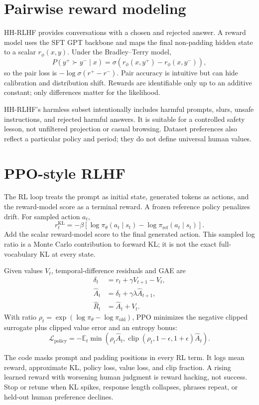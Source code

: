 \documentclass[11pt]{article}
\newcommand{\E}{\mathbb{E}}
\begin{document}
\section{Pairwise reward modeling}

HH-RLHF provides conversations with a chosen and rejected answer. A reward model
uses the SFT GPT backbone and maps the final non-padding hidden state to a scalar
$r_\phi(x,y)$. Under the Bradley--Terry model,
\[
P(y^+\succ y^-\mid x)=\sigma(r_\phi(x,y^+)-r_\phi(x,y^-)),
\]
so the pair loss is $-\log\sigma(r^+-r^-)$. Pair accuracy is intuitive but can
hide calibration and distribution shift. Rewards are identifiable only up to an
additive constant; only differences matter for the likelihood.

HH-RLHF's harmless subset intentionally includes harmful prompts, slurs, unsafe
instructions, and rejected harmful answers. It is suitable for a controlled
safety lesson, not unfiltered projection or casual browsing. Dataset preferences
also reflect a particular policy and period; they do not define universal human
values.

\section{PPO-style RLHF}

The RL loop treats the prompt as initial state, generated tokens as actions, and
the reward-model score as a terminal reward. A frozen reference policy penalizes
drift. For sampled action $a_t$,
\[
r_t^{\mathrm{KL}}=-\beta\left[
\log\pi_\theta(a_t\mid s_t)-\log\pi_{\mathrm{ref}}(a_t\mid s_t)\right].
\]
Add the scalar reward-model score to the final generated action. This sampled log
ratio is a Monte Carlo contribution to forward KL; it is not the exact full-
vocabulary KL at every state.

Given values $V_t$, temporal-difference residuals and GAE are
\begin{align*}
\delta_t &= r_t+\gamma V_{t+1}-V_t,\\
\hat A_t &= \delta_t+\gamma\lambda\hat A_{t+1},\\
\hat R_t &= \hat A_t+V_t.
\end{align*}
With ratio $\rho_t=\exp(\log\pi_\theta-\log\pi_{\mathrm{old}})$, PPO minimizes the
negative clipped surrogate plus clipped value error and an entropy bonus:
\[
\mathcal L_{\mathrm{policy}}=-\E_t\min\left(
\rho_t\hat A_t,
\operatorname{clip}(\rho_t,1-\epsilon,1+\epsilon)\hat A_t
\right).
\]

The code masks prompt and padding positions in every RL term. It logs mean reward,
approximate KL, policy loss, value loss, and clip fraction. A rising learned
reward with worsening human judgment is reward hacking, not success. Stop or
retune when KL spikes, response length collapses, phrases repeat, or held-out
human preference declines.
\end{document}
